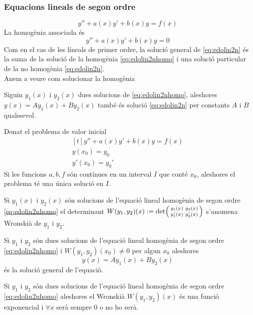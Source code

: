\documentclass[../main.tex]{subfiles}
\begin{document}
\subsubsection{Equacions lineals de segon ordre}
\begin{equation}
	y'' + a(x)y' + b(x)y = f(x)
	\label{eq:edolin2n}
\end{equation}
La homogènia associada és
\begin{equation}
	y'' + a(x)y' + b(x)y = 0\label{eq:edolin2nhomo}
\end{equation}
Com en el cas de les líneals de primer ordre, la solució general de \eqref{eq:edolin2n} és la suma de la solució de la homogènia \eqref{eq:edolin2nhomo} i una solució particular de la no homogènia \eqref{eq:edolin2n}.\\
Anem a veure com solucionar la homogènia
\begin{proposicio}
	Siguin $y_1(x)$ i $y_2(x)$ dues solucions de \eqref{eq:edolin2nhomo}, aleshores $y(x) = Ay_1(x) + By_2(x)$ també és solució \eqref{eq:edolin2n} per constants $A$ i $B$ qualssevol.
\end{proposicio}
\begin{teorema}
	Donat el problema de valor inicial
	\begin{displaymath}
		\begin{aligned}[t]
			y'' + a(x)y' + b(x)y = f(x)\\
			y(x_0) = y_0\\
			y'(x_0) = y_0'
		\end{aligned}
	\end{displaymath}
	Si les funcions $a, b, f$ són contínues en un interval $I$ que conté $x_0$, aleshores el problema té una única solució en $I$.
\end{teorema}
\begin{definicio}
	Si $y_1(x)$ i $y_2(x)$ són solucions de l'equació lineal homogènia de segon ordre \eqref{eq:edolin2nhomo} el determinant $W(y_1,y_2)(x) := \det\begin{psmallmatrix}y_1(x) & y_2(x)\\y_1'(x) & y_2'(x)\end{psmallmatrix}$ s'anomena Wronskià de $y_1$ i $y_2$.
\end{definicio}
\begin{teorema}
	Si $y_1$ i $y_2$ són dues solucions de l'equació lineal homogènia de segon ordre \eqref{eq:edolin2nhomo} i $W(y_1,y_2)(x_0) \neq 0$ per algun $x_0$ aleshores
	\begin{displaymath}
		y(x) = Ay_1(x) + By_2(x)
	\end{displaymath}
	és la solució general de l'equació.
\end{teorema}
\begin{teorema}[de Abel]
	Si $y_1$ i $y_2$ són dues solucions de l'equació lineal homogènia de segon ordre \eqref{eq:edolin2nhomo} aleshores el Wronskià $W(y_1,y_2)(x)$ és una funció exponencial i $\forall x$ serà sempre $0$ o no ho serà.
\end{teorema}
\end{document}
